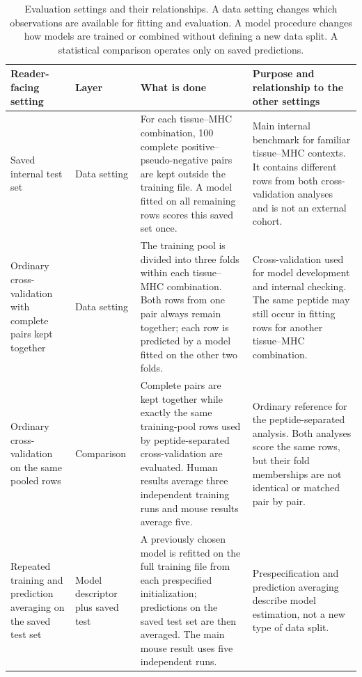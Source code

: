 \begin{table}[t]
\centering
\caption{Evaluation settings and their relationships. A data setting changes which observations are available for fitting and evaluation. A model procedure changes how models are trained or combined without defining a new data split. A statistical comparison operates only on saved predictions.}
\label{tab:evaluation-protocols}
\fontsize{7.5}{8.5}\selectfont
\setlength{\tabcolsep}{1.5pt}
\begin{tabular}{@{}>{\raggedright\arraybackslash}p{2.25cm}
                    >{\raggedright\arraybackslash}p{1.6cm}
                    >{\raggedright\arraybackslash}p{3.75cm}
                    >{\raggedright\arraybackslash}p{3.75cm}@{}}
\toprule
Reader-facing setting & Layer & What is done & Purpose and relationship to the other settings \\
\midrule
Saved internal test set
& Data setting
& For each tissue--MHC combination, 100 complete positive--pseudo-negative pairs are kept outside the training file. A model fitted on all remaining rows scores this saved set once.
& Main internal benchmark for familiar tissue--MHC contexts. It contains different rows from both cross-validation analyses and is not an external cohort. \\
\midrule
Ordinary cross-validation with complete pairs kept together
& Data setting
& The training pool is divided into three folds within each tissue--MHC combination. Both rows from one pair always remain together; each row is predicted by a model fitted on the other two folds.
& Cross-validation used for model development and internal checking. The same peptide may still occur in fitting rows for another tissue--MHC combination. \\
\midrule
Ordinary cross-validation on the same pooled rows
& Comparison
& Complete pairs are kept together while exactly the same training-pool rows used by peptide-separated cross-validation are evaluated. Human results average three independent training runs and mouse results average five.
& Ordinary reference for the peptide-separated analysis. Both analyses score the same rows, but their fold memberships are not identical or matched pair by pair. \\
\midrule
Repeated training and prediction averaging on the saved test set
& Model descriptor plus saved test
& A previously chosen model is refitted on the full training file from each prespecified initialization; predictions on the saved test set are then averaged. The main mouse result uses five independent runs.
& Prespecification and prediction averaging describe model estimation, not a new type of data split. \\
\bottomrule
\end{tabular}
\end{table}

